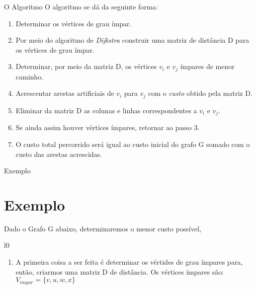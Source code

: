 \documentclass[xcolor=table]{beamer}
\begin{document}
\begin{frame}{O Algoritmo }
O algoritmo se dá da seguinte forma:

\begin{enumerate}
    \item Determinar os vértices de grau ímpar.
    \item Por meio do algoritmo de \textit{Dijkstra} construir uma matriz de distância D para os vértices de grau ímpar.
    \item Determinar, por meio da matriz D, os vértices $v_{i}$ e $v_{j}$ ímpares de menor caminho.
    \item Acrescentar arestas artificiais de $v_{i}$ para $v_{j}$ com o \textit{custo} obtido pela matriz D. 
    \item Eliminar da matriz D as colunas e linhas correspondentes a $v_{i}$ e $v_{j}$.
    \item Se ainda assim houver vértices ímpares, retornar ao passo 3.
    \item O custo total percorrido será igual ao custo inicial do grafo G somado com o custo das arestas acrescidas.
\end{enumerate}
    
\end{frame}

\begin{frame}{Exemplo}
\section{Exemplo}
Dado o Grafo G abaixo, determinaremos o menor custo possível, 

\begin{wrapfigure}{l}{0\textwidth}
\end{wrapfigure}

\noindent \begin{enumerate}
    \item A primeira coisa a ser feita é determinar os vértides de grau ímpares para, então, criarmos uma matriz D de distância. Os vértices ímpares são: $V_{impar} = \{v, u, w, x\}$
\end{enumerate}
\end{frame}
\end{document}
